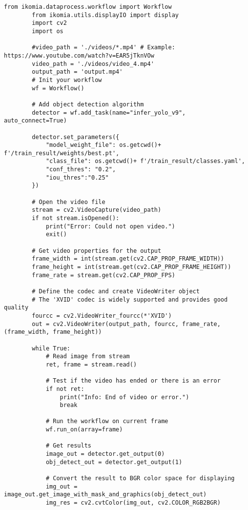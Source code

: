     \begin{lstlisting}[caption={detect.py}]
        from ikomia.dataprocess.workflow import Workflow
        from ikomia.utils.displayIO import display
        import cv2
        import os
        
        #video_path = './videos/*.mp4' # Example: https://www.youtube.com/watch?v=EAR5jTknVOw
        video_path = './videos/video_4.mp4'
        output_path = 'output.mp4'
        # Init your workflow
        wf = Workflow()
        
        # Add object detection algorithm
        detector = wf.add_task(name="infer_yolo_v9", auto_connect=True)
        
        detector.set_parameters({
            "model_weight_file": os.getcwd()+ f'/train_result/weights/best.pt',
            "class_file": os.getcwd()+ f'/train_result/classes.yaml',
            "conf_thres": "0.2",
            "iou_thres":"0.25"
        })
        
        # Open the video file
        stream = cv2.VideoCapture(video_path)
        if not stream.isOpened():
            print("Error: Could not open video.")
            exit()
        
        # Get video properties for the output
        frame_width = int(stream.get(cv2.CAP_PROP_FRAME_WIDTH))
        frame_height = int(stream.get(cv2.CAP_PROP_FRAME_HEIGHT))
        frame_rate = stream.get(cv2.CAP_PROP_FPS)
        
        # Define the codec and create VideoWriter object
        # The 'XVID' codec is widely supported and provides good quality
        fourcc = cv2.VideoWriter_fourcc(*'XVID')
        out = cv2.VideoWriter(output_path, fourcc, frame_rate, (frame_width, frame_height))
        
        while True:
            # Read image from stream
            ret, frame = stream.read()
        
            # Test if the video has ended or there is an error
            if not ret:
                print("Info: End of video or error.")
                break
        
            # Run the workflow on current frame
            wf.run_on(array=frame)
        
            # Get results
            image_out = detector.get_output(0)
            obj_detect_out = detector.get_output(1)
        
            # Convert the result to BGR color space for displaying
            img_out = image_out.get_image_with_mask_and_graphics(obj_detect_out)
            img_res = cv2.cvtColor(img_out, cv2.COLOR_RGB2BGR)
        

\end{lstlisting}
